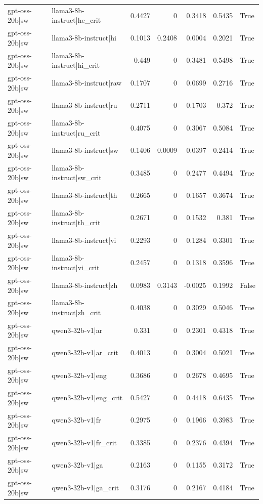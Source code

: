 \begin{table}
\begin{tabular}{l l r r r r l}
gpt-oss-20b|sw & llama3-8b-instruct|he_crit & 0.4427 & 0 & 0.3418 & 0.5435 & True \\
gpt-oss-20b|sw & llama3-8b-instruct|hi & 0.1013 & 0.2408 & 0.0004 & 0.2021 & True \\
gpt-oss-20b|sw & llama3-8b-instruct|hi_crit & 0.449 & 0 & 0.3481 & 0.5498 & True \\
gpt-oss-20b|sw & llama3-8b-instruct|raw & 0.1707 & 0 & 0.0699 & 0.2716 & True \\
gpt-oss-20b|sw & llama3-8b-instruct|ru & 0.2711 & 0 & 0.1703 & 0.372 & True \\
gpt-oss-20b|sw & llama3-8b-instruct|ru_crit & 0.4075 & 0 & 0.3067 & 0.5084 & True \\
gpt-oss-20b|sw & llama3-8b-instruct|sw & 0.1406 & 0.0009 & 0.0397 & 0.2414 & True \\
gpt-oss-20b|sw & llama3-8b-instruct|sw_crit & 0.3485 & 0 & 0.2477 & 0.4494 & True \\
gpt-oss-20b|sw & llama3-8b-instruct|th & 0.2665 & 0 & 0.1657 & 0.3674 & True \\
gpt-oss-20b|sw & llama3-8b-instruct|th_crit & 0.2671 & 0 & 0.1532 & 0.381 & True \\
gpt-oss-20b|sw & llama3-8b-instruct|vi & 0.2293 & 0 & 0.1284 & 0.3301 & True \\
gpt-oss-20b|sw & llama3-8b-instruct|vi_crit & 0.2457 & 0 & 0.1318 & 0.3596 & True \\
gpt-oss-20b|sw & llama3-8b-instruct|zh & 0.0983 & 0.3143 & -0.0025 & 0.1992 & False \\
gpt-oss-20b|sw & llama3-8b-instruct|zh_crit & 0.4038 & 0 & 0.3029 & 0.5046 & True \\
gpt-oss-20b|sw & qwen3-32b-v1|ar & 0.331 & 0 & 0.2301 & 0.4318 & True \\
gpt-oss-20b|sw & qwen3-32b-v1|ar_crit & 0.4013 & 0 & 0.3004 & 0.5021 & True \\
gpt-oss-20b|sw & qwen3-32b-v1|eng & 0.3686 & 0 & 0.2678 & 0.4695 & True \\
gpt-oss-20b|sw & qwen3-32b-v1|eng_crit & 0.5427 & 0 & 0.4418 & 0.6435 & True \\
gpt-oss-20b|sw & qwen3-32b-v1|fr & 0.2975 & 0 & 0.1966 & 0.3983 & True \\
gpt-oss-20b|sw & qwen3-32b-v1|fr_crit & 0.3385 & 0 & 0.2376 & 0.4394 & True \\
gpt-oss-20b|sw & qwen3-32b-v1|ga & 0.2163 & 0 & 0.1155 & 0.3172 & True \\
gpt-oss-20b|sw & qwen3-32b-v1|ga_crit & 0.3176 & 0 & 0.2167 & 0.4184 & True \\

\end{tabular}
\end{table}
